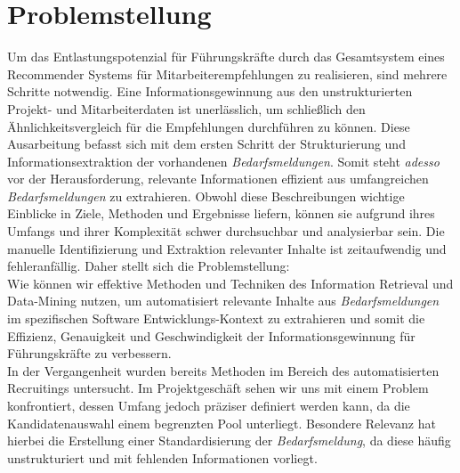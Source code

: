 \section{Problemstellung}
\label{sec:problemstellung}
Um das Entlastungspotenzial für Führungskräfte durch das Gesamtsystem eines Recommender Systems für Mitarbeiterempfehlungen zu realisieren, sind mehrere Schritte notwendig. Eine Informationsgewinnung aus den unstrukturierten Projekt- und Mitarbeiterdaten ist unerlässlich, um schließlich den Ähnlichkeitsvergleich für die Empfehlungen durchführen zu können. Diese Ausarbeitung befasst sich mit dem ersten Schritt der Strukturierung und Informationsextraktion der vorhandenen \emph{Bedarfsmeldungen}. Somit steht \emph{adesso} vor der Herausforderung, relevante Informationen effizient aus umfangreichen \emph{Bedarfsmeldungen} zu extrahieren. Obwohl diese Beschreibungen wichtige Einblicke in Ziele, Methoden und Ergebnisse liefern, können sie aufgrund ihres Umfangs und ihrer Komplexität schwer durchsuchbar und analysierbar sein. Die manuelle Identifizierung und Extraktion relevanter Inhalte ist zeitaufwendig und fehleranfällig. Daher stellt sich die Problemstellung: \\

Wie können wir effektive Methoden und Techniken des Information Retrieval und Data-Mining nutzen, um automatisiert relevante Inhalte aus \emph{Bedarfsmeldungen} im spezifischen Software Entwicklungs-Kontext zu extrahieren und somit die Effizienz, Genauigkeit und Geschwindigkeit der Informationsgewinnung für Führungskräfte zu verbessern.\\

In der Vergangenheit wurden bereits Methoden im Bereich des automatisierten Recruitings untersucht. Im Projektgeschäft sehen wir uns mit einem Problem konfrontiert, dessen Umfang jedoch präziser definiert werden kann, da die Kandidatenauswahl einem begrenzten Pool unterliegt. Besondere Relevanz hat hierbei die Erstellung einer Standardisierung der \emph{Bedarfsmeldung}, da diese häufig unstrukturiert und mit fehlenden Informationen vorliegt.
